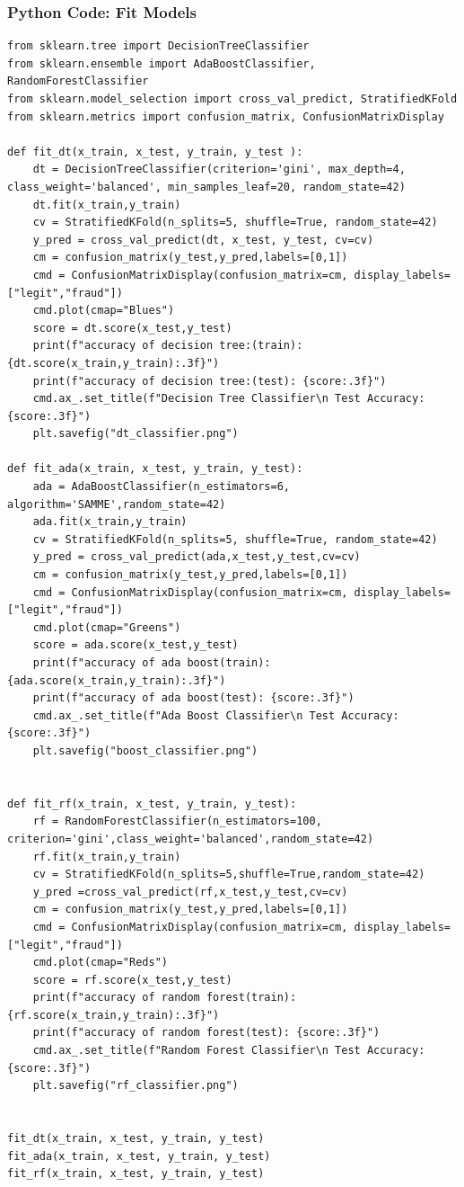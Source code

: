 \documentclass{article}
\begin{document}
\subsubsection*{Python Code: Fit Models}
\begin{lstlisting}
from sklearn.tree import DecisionTreeClassifier
from sklearn.ensemble import AdaBoostClassifier, RandomForestClassifier
from sklearn.model_selection import cross_val_predict, StratifiedKFold
from sklearn.metrics import confusion_matrix, ConfusionMatrixDisplay

def fit_dt(x_train, x_test, y_train, y_test ):
    dt = DecisionTreeClassifier(criterion='gini', max_depth=4, class_weight='balanced', min_samples_leaf=20, random_state=42)
    dt.fit(x_train,y_train)
    cv = StratifiedKFold(n_splits=5, shuffle=True, random_state=42)
    y_pred = cross_val_predict(dt, x_test, y_test, cv=cv)
    cm = confusion_matrix(y_test,y_pred,labels=[0,1])
    cmd = ConfusionMatrixDisplay(confusion_matrix=cm, display_labels=["legit","fraud"])
    cmd.plot(cmap="Blues")
    score = dt.score(x_test,y_test)
    print(f"accuracy of decision tree:(train): {dt.score(x_train,y_train):.3f}")
    print(f"accuracy of decision tree:(test): {score:.3f}")
    cmd.ax_.set_title(f"Decision Tree Classifier\n Test Accuracy: {score:.3f}")
    plt.savefig("dt_classifier.png")

def fit_ada(x_train, x_test, y_train, y_test):
    ada = AdaBoostClassifier(n_estimators=6, algorithm='SAMME',random_state=42)
    ada.fit(x_train,y_train)
    cv = StratifiedKFold(n_splits=5, shuffle=True, random_state=42)
    y_pred = cross_val_predict(ada,x_test,y_test,cv=cv)
    cm = confusion_matrix(y_test,y_pred,labels=[0,1])
    cmd = ConfusionMatrixDisplay(confusion_matrix=cm, display_labels=["legit","fraud"])
    cmd.plot(cmap="Greens")
    score = ada.score(x_test,y_test)
    print(f"accuracy of ada boost(train): {ada.score(x_train,y_train):.3f}")
    print(f"accuracy of ada boost(test): {score:.3f}")
    cmd.ax_.set_title(f"Ada Boost Classifier\n Test Accuracy: {score:.3f}")
    plt.savefig("boost_classifier.png")


def fit_rf(x_train, x_test, y_train, y_test):
    rf = RandomForestClassifier(n_estimators=100, criterion='gini',class_weight='balanced',random_state=42)
    rf.fit(x_train,y_train)
    cv = StratifiedKFold(n_splits=5,shuffle=True,random_state=42)
    y_pred =cross_val_predict(rf,x_test,y_test,cv=cv)
    cm = confusion_matrix(y_test,y_pred,labels=[0,1])
    cmd = ConfusionMatrixDisplay(confusion_matrix=cm, display_labels=["legit","fraud"])
    cmd.plot(cmap="Reds")
    score = rf.score(x_test,y_test)
    print(f"accuracy of random forest(train): {rf.score(x_train,y_train):.3f}")
    print(f"accuracy of random forest(test): {score:.3f}")
    cmd.ax_.set_title(f"Random Forest Classifier\n Test Accuracy: {score:.3f}")
    plt.savefig("rf_classifier.png")


fit_dt(x_train, x_test, y_train, y_test)
fit_ada(x_train, x_test, y_train, y_test)
fit_rf(x_train, x_test, y_train, y_test)

\end{lstlisting}
\end{document}
